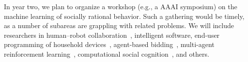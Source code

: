 In year two, we plan to organize a workshop (e.g., a AAAI symposium)
on the machine learning of socially rational behavior. Such a
gathering would be timely, as a number of subareas are grappling with
related problems. We will include researchers in human--robot
collaboration~\cite{gopalan15}, intelligent software, end-user
programming of household devices~\cite{ur14}, agent-based
bidding~\cite{tac:book}, multi-agent reinforcement
learning~\cite{sodomka13}, computational social
cognition~\cite{baker14}, and others.


